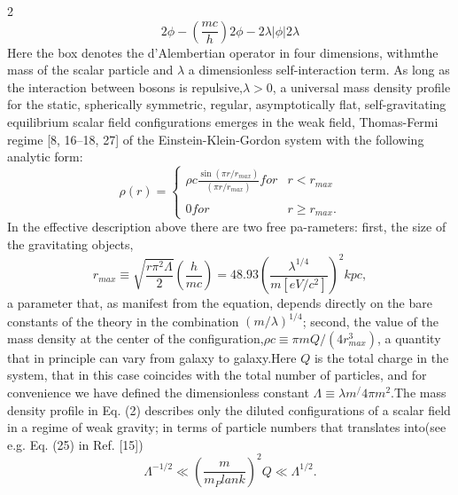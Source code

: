\documentclass{article}
\providecommand{\abs}[1]{\lvert#1\rvert}
\begin{document}
\begin{multicols} {2}
\begin{equation}
{2\phi−{(\frac{mc}{h})}{2\phi-2\lambda{\abs{\phi}{2\lambda}}}}
\end{equation}
Here the box denotes the d’Alembertian operator in four dimensions, withmthe mass of the scalar particle and $\lambda$ a dimensionless self-interaction term.  As long as the interaction between bosons is repulsive,$\lambda>0$, a universal  mass  density  profile  for  the  static,  spherically  symmetric, regular, asymptotically flat, self-gravitating equilibrium  scalar  field  configurations  emerges  in  the  weak field, Thomas-Fermi regime [8, 16–18, 27] of the Einstein-Klein-Gordon system with the following analytic form:
\begin{equation}
 {\rho(r)} = \left\{ \begin{array}{lcc}
             {\rho c}{\frac{\sin(\pi r/r_{max})}{(\pi r/r_{max})}} for &r < r_{max}\\
             \\ 0 for &r{\geq}r_{max}.
             \end{array}
   \right.
\end{equation}
In the effective description above there are two free pa-rameters:  first, the size of the gravitating objects,
\begin{equation}
 r_{max}\equiv{\sqrt{\frac{r{\pi}^{2}{\Lambda}}{2}}{\left(\frac{h}{mc}\right)}= 48.93{\left(\frac{\lambda^{1/4}}{m[eV/c^2]}\right)}}^2{kpc},  
\end{equation}
a parameter that, as manifest from the equation, depends directly on the bare constants of the theory in the combination $(m/\lambda)^{1/4}$;  second, the value of the mass density at the center of the configuration,$\rho c\equiv \pi mQ/(4r^3_{max})$, a quantity that in principle can vary from galaxy to galaxy.Here $Q$ is  the  total  charge  in  the  system,  that  in  this case coincides with the total number of particles, and for convenience we have defined the dimensionless constant $\Lambda \equiv \lambda m^/4\pi m^2$.The mass density profile in Eq. (2) describes only the diluted configurations of a scalar field in a regime of weak gravity; in terms of particle numbers that translates into(see e.g.  Eq. (25) in Ref. [15])
\begin{equation}
{\Lambda^{-1/2}}\ll {\left(\frac{m}{m_Plank}\right)}^2{Q}\ll {\Lambda^{1/2}}.
\end{equation}

\end{multicols}
\end{document}
